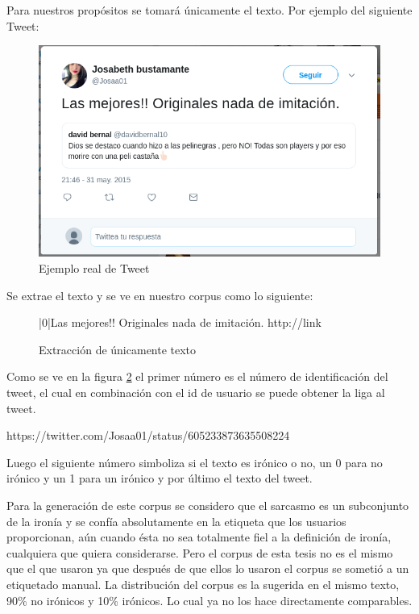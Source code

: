 \par Para nuestros propósitos se tomará únicamente el texto. Por ejemplo del siguiente Tweet:
\begin{figure}[h!]
	\centering
	\includegraphics[width=\linewidth]{imagenes/ejemploTweet.png}
	\caption{Ejemplo real de Tweet}
	\label{fig:ejTweet}
\end{figure}

\par Se extrae el texto y se ve en nuestro corpus como lo siguiente:

\begin{figure}[!ht]
	|0|Las mejores!! Originales nada de imitación. http://link
	\caption{Extracción de únicamente texto}
	\label{fig:ejTweetText}
\end{figure}

\par Como se ve en la figura \ref{fig:ejTweetText} el primer número es el número de identificación del tweet, el cual en combinación con el id de usuario se puede obtener la liga al tweet.

\vspace{5pt}
\begin{center}
	\par https://twitter.com/Josaa01/status/605233873635508224    
\end{center}

\vspace{5pt}
\par Luego el siguiente número simboliza si el texto es irónico o no, un 0 para no irónico y un 1 para un irónico y por último el texto del tweet.

\par Para la generación de este corpus se considero que el sarcasmo es un subconjunto de la ironía y se confía absolutamente en la etiqueta que los usuarios proporcionan, aún cuando ésta no sea totalmente fiel a la definición de ironía, cualquiera que quiera considerarse. Pero el corpus de esta tesis no es el mismo que el que usaron \cite{lopez2016character} ya que después de que ellos lo usaron el corpus se sometió a un etiquetado manual. La distribución del corpus es la sugerida en el mismo texto, 90\% no irónicos y 10\% irónicos. Lo cual ya no los hace directamente comparables. 

